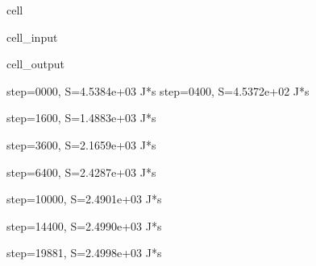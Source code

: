 \documentclass[letterpaper,10pt,english]{jupyterBook}
\begin{document}
\begin{sphinxuseclass}{cell}
\begin{sphinxVerbatimInput}
\begin{sphinxuseclass}{cell_input}
\end{sphinxuseclass}\end{sphinxVerbatimInput}
\begin{sphinxVerbatimOutput}

\begin{sphinxuseclass}{cell_output}
\begin{sphinxVerbatim}[commandchars=\\\{\}]
step=0000, S=4.5384e+03 J*s
step=0400, S=\PYGZhy{}4.5372e+02 J*s
\end{sphinxVerbatim}

\begin{sphinxVerbatim}[commandchars=\\\{\}]
step=1600, S=\PYGZhy{}1.4883e+03 J*s
\end{sphinxVerbatim}

\begin{sphinxVerbatim}[commandchars=\\\{\}]
step=3600, S=\PYGZhy{}2.1659e+03 J*s
\end{sphinxVerbatim}

\begin{sphinxVerbatim}[commandchars=\\\{\}]
step=6400, S=\PYGZhy{}2.4287e+03 J*s
\end{sphinxVerbatim}

\begin{sphinxVerbatim}[commandchars=\\\{\}]
step=10000, S=\PYGZhy{}2.4901e+03 J*s
\end{sphinxVerbatim}

\begin{sphinxVerbatim}[commandchars=\\\{\}]
step=14400, S=\PYGZhy{}2.4990e+03 J*s
\end{sphinxVerbatim}

\begin{sphinxVerbatim}[commandchars=\\\{\}]
step=19881, S=\PYGZhy{}2.4998e+03 J*s
\end{sphinxVerbatim}

\noindent{}

\end{sphinxuseclass}\end{sphinxVerbatimOutput}

\end{sphinxuseclass}
\end{document}
